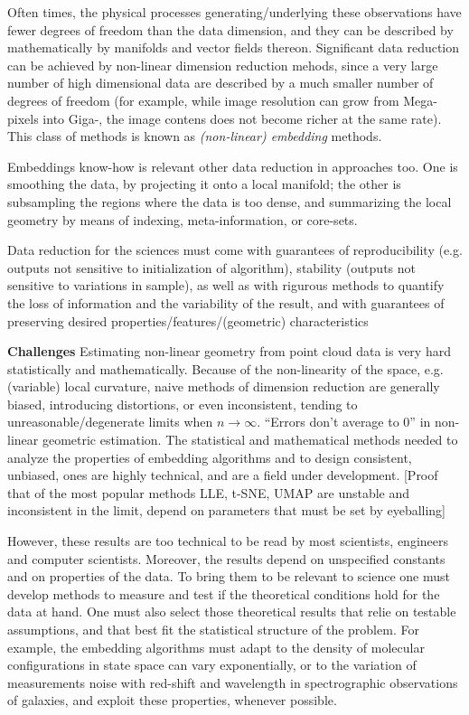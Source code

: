 \documentclass[floatfix,11pt]{revtex4}
\begin{document}
Often times, the physical processes generating/underlying these observations have fewer degrees of freedom than the data dimension, and they can be described by mathematically by manifolds and vector fields thereon.  Significant data reduction can be achieved by non-linear dimension reduction mehods, since a very large number of high dimensional data are described by a much smaller number of degrees of freedom (for example, while image resolution can grow from Mega-pixels into Giga-, the image contens does not become richer at the same rate). This class of methods is known as {\em (non-linear) embedding} methods. 

 Embeddings know-how is relevant other data reduction in approaches too. One is smoothing the data, by projecting it onto a local manifold; the other is subsampling the regions where the data is too dense, and summarizing the local geometry by means of indexing, meta-information, or core-sets.

Data reduction for the sciences must come with guarantees of
  reproducibility (e.g. outputs not sensitive to initialization of
  algorithm), stability (outputs not sensitive to variations in
  sample), as well as with rigurous methods to quantify the loss of
  information and the variability of the result, and with
  guarantees of preserving desired properties/features/(geometric)
  characteristics

\textbf{Challenges} Estimating non-linear geometry from point cloud data is very hard statistically and mathematically. Because of the non-linearity of the space, e.g.  (variable) local curvature, naive methods of dimension reduction are generally biased, introducing distortions, or even inconsistent, tending to unreasonable/degenerate limits when $n\rightarrow \infty$. ``Errors don't average to 0'' in non-linear geometric estimation. The statistical and mathematical methods needed to analyze the properties of embedding algorithms and to design consistent, unbiased, ones are highly technical, and are a field under development. [Proof that of the most popular methods LLE, t-SNE, UMAP are unstable and inconsistent in the limit, depend on parameters that must be set by eyeballing]

However, these results are too technical to be read by most scientists, engineers and computer scientists. Moreover, the results depend on unspecified constants and on properties of the data. To bring them to be relevant to science one must develop methods to measure and test if the theoretical conditions hold for the data at hand. One must also select those theoretical results that relie on testable assumptions, and that best fit the statistical structure of the problem. For example, the embedding algorithms must adapt to  the density of molecular configurations in state space can vary exponentially, or to the variation of measurements noise with red-shift and wavelength in spectrographic observations of galaxies, and exploit these properties, whenever possible.
\end{document}
